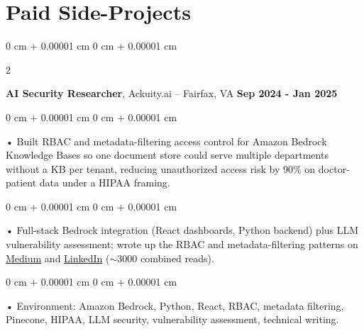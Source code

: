 \documentclass[10pt, letterpaper]{article}
\newenvironment{onecolentry}{
    \begin{adjustwidth}{
        0 cm + 0.00001 cm
    }{
        0 cm + 0.00001 cm
    }
}{
    \end{adjustwidth}
} %
\newenvironment{twocolentry}[2][]{
    \onecolentry
    \def\secondColumn{#2}
    \setcolumnwidth{\fill, 4.5 cm}
    \begin{paracol}{2}
}{
    \switchcolumn \raggedleft \secondColumn
    \end{paracol}
    \endonecolentry
} %
\begin{document}
    \section{Paid Side-Projects}
            \vspace{2 pt }
                    \begin{twocolentry}{
            \textbf{Sep 2024 - Jan 2025}
        }
            \textbf{AI Security Researcher}, Ackuity.ai -- Fairfax, VA\end{twocolentry}

        \begin{onecolentry}
             • Built RBAC and metadata-filtering access control for Amazon Bedrock Knowledge Bases so one document store could serve multiple departments without a KB per tenant, reducing unauthorized access risk by 90\% on doctor-patient data under a HIPAA framing.
        \end{onecolentry}
        \begin{onecolentry}
             • Full-stack Bedrock integration (React dashboards, Python backend) plus LLM vulnerability assessment; wrote up the RBAC and metadata-filtering patterns on \href{https://medium.com/@sreenikethaathreya/building-a-permission-aware-genai-application-on-amazon-bedrock-8fdc2410dd43}{Medium} and \href{https://www.linkedin.com/pulse/building-permission-aware-genai-application-amazon-bedrock-aathreya-g7nme/}{LinkedIn} ($\sim$3000 combined reads).
        \end{onecolentry}
        \begin{onecolentry}
             • Environment: Amazon Bedrock, Python, React, RBAC, metadata filtering, Pinecone, HIPAA, LLM security, vulnerability assessment, technical writing.

        \end{onecolentry}

        \vspace{0.4cm}
\end{document}
